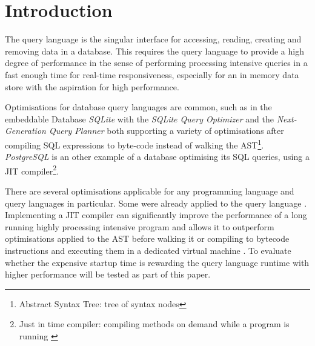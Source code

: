 \chapter{Introduction}

The query language is the singular interface for accessing, reading, creating
and removing data in a database. This requires the query language to provide a
high degree of performance in the sense of performing processing intensive
queries in a fast enough time for real-time responsiveness, especially for an
in memory data store with the aspiration for high performance.

Optimisations for database query languages are common, such as in the
embeddable Database \textit{SQLite} with the \textit{SQLite Query
Optimizer}\cite{sqlite_query_opt} and the \textit{Next-Generation Query
Planner}\cite{sqlite_query_opt} both supporting a variety of optimisations
after compiling SQL expressions to byte-code instead of walking the
AST\footnote{Abstract Syntax Tree: tree of syntax
nodes}\cite{sqlite_next_gen_query_plan}. \textit{PostgreSQL} is an other
example of a database optimising its SQL queries, using a JIT compiler\footnote{Just in
time compiler: compiling methods on demand while a program is running \cite[1.
Introduction]{java_jit_compilation}}\cite{postgres_jit}.

There are several optimisations applicable for any programming language and
query languages in particular. Some were already applied to the query language
\cite{parser2_opt}. Implementing a JIT compiler can significantly improve the
performance of a long running highly processing intensive program and allows it
to outperform optimisations applied to the AST before walking it or compiling
to bytecode instructions and executing them in a dedicated virtual machine
\cite[4. Results]{java_jit_compilation}. To evaluate whether the expensive
startup time is rewarding the query language runtime with higher performance
will be tested as part of this paper.
